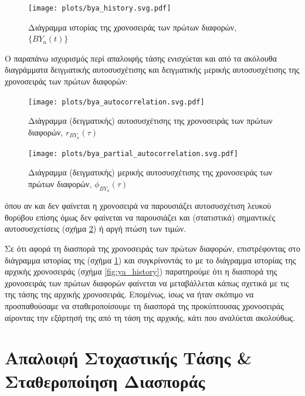 \begin{figure}[H]
    \begin{center}
        \texttt{[image: plots/bya\_history.svg.pdf]}
        \caption{Διάγραμμα ιστορίας της χρονοσειράς των πρώτων διαφορών, $\{BY_a(t)\}$}
        \label{fig:bya_history}
    \end{center}
\end{figure}

Ο παραπάνω ισχυρισμός περί απαλοιφής τάσης ενισχύεται και από τα ακόλουθα διαγράμματα δειγµατικής αυτοσυσχέτισης και δειγµατικής µερικής αυτοσυσχέτισης της χρονοσειράς των πρώτων διαφορών:

\begin{figure}[H]
    \begin{center}
        \texttt{[image: plots/bya\_autocorrelation.svg.pdf]}
        \caption{Διάγραμμα (δειγματικής) αυτοσυσχέτισης της χρονοσειράς των πρώτων διαφορών, $r_{BY_a}(\tau)$}
        \label{fig:bya_autocorrelation}
    \end{center}
\end{figure}

\begin{figure}[H]
    \begin{center}
        \texttt{[image: plots/bya\_partial\_autocorrelation.svg.pdf]}
        \caption{Διάγραμμα (δειγματικής) μερικής αυτοσυσχέτισης της χρονοσειράς των πρώτων διαφορών, $\phi_{BY_a}(\tau)$}
        \label{fig:bya_partial_autocorrelation}
    \end{center}
\end{figure}

όπου αν και δεν φαίνεται η χρονοσειρά να παρουσιάζει αυτοσυσχέτιση λευκού θορύβου επίσης όμως δεν φαίνεται να παρουσιάζει και (στατιστικά) σημαντικές αυτοσυσχετίσεις (σχήμα \ref{fig:bya_autocorrelation}) ή αργή πτώση των τιμών. 

Σε ότι αφορά τη διασπορά της χρονοσειράς των πρώτων διαφορών, επιστρέφοντας στο διάγραμμα ιστορίας της (σχήμα \ref{fig:bya_history}) και συγκρίνοντάς το με το διάγραμμα ιστορίας της αρχικής χρονοσειράς (σχήμα \ref{fig:ya_history}) παρατηρούμε ότι η διασπορά της χρονοσειράς των πρώτων διαφορών φαίνεται να μεταβάλλεται κάπως σχετικά με τις  της τάσης της αρχικής χρονοσειράς. Επομένως, ίσως να ήταν σκόπιμο να προσπαθούσαμε να σταθεροποίσουμε τη διασπορά της προκύπτουσας χρονοσειράς αίροντας την εξάρτησή της από τη τάση της αρχικής, κάτι που αναλύεται ακολούθως.

\section{Απαλοιφή Στοχαστικής Τάσης \& Σταθεροποίηση Διασποράς}

